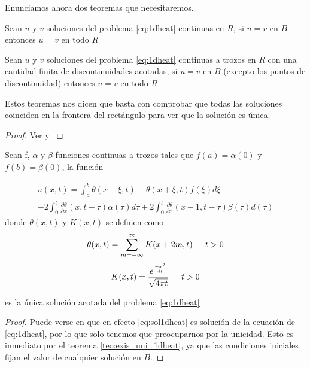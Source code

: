 Enunciamos ahora dos teoremas que necesitaremos.


\begin{teorema}[Unicidad]
	Sean $u$ y $v$ soluciones del problema \eqref{eq:1dheat} continuas en $R$, si $u=v$ en $B$ entonces $u=v$ en todo $R$
\end{teorema}

\begin{teorema}
	Sean $u$ y $v$ soluciones del problema \eqref{eq:1dheat} continuas a trozos en $R$ con una cantidad finita de discontinuidades acotadas, si $u=v$ en $B$ (excepto los puntos de discontinuidad) entonces $u=v$ en todo $R$
\end{teorema}

Estos teoremas nos dicen que basta con comprobar que todas las soluciones coinciden en la frontera del rectángulo para ver que la solución es única.

\begin{proof}
	Ver \cite[Th. 1.6.4]{1dheat} y \cite[Th. 1.6.6]{1dheat}
\end{proof}


\begin{teorema}\label{teo:exis_uni_1dheat}
	Sean f, $\alpha$ y $\beta$ funciones continuas a trozos tales que $f(a)=\alpha(0)$ y $f(b)=\beta(0)$, la función
	
	\begin{multline}\label{eq:sol1dheat}
		u(x,t) = \int_{a}^{b}\theta(x-\xi,t)-\theta(x+\xi,t)f(\xi)d\xi \\
		- 2\int_{0}^{t}\frac{\partial \theta}{\partial x}(x, t-\tau)\alpha(\tau)d\tau+2\int_{0}^{t}\frac{\partial\theta}{\partial x}(x-1,t-\tau)\beta(\tau)d(\tau)
	\end{multline}
	donde $\theta(x,t)$ y $K(x,t)$ se definen como
	\[
		\theta(x,t)=\sum_{m=-\infty}^{\infty}K(x+2m,t) \hspace{15px} t>0
	\]\[
		K(x,t)=\frac{e^{\frac{-x^2}{4t}}}{\sqrt{4\pi t}}\hspace{15px} t>0
	\]
	
	es la única solución acotada del problema \ref{eq:1dheat}
	
\end{teorema}

\begin{proof}
	Puede verse en \cite[Secs. 6.1-2]{1dheat} que en efecto \eqref{eq:sol1dheat} es solución de la ecuación de \eqref{eq:1dheat}, por lo que solo tenemos que preocuparnos por la unicidad. Esto es inmediato por el teorema \ref{teo:exis_uni_1dheat}, ya que las condiciones iniciales fijan el valor de cualquier solución en $B$.
\end{proof}

